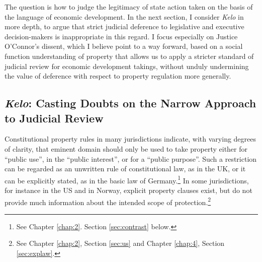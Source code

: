 
The question is how to judge the legitimacy of state action taken on the basis of the language of economic development. In the next section, I consider {\it Kelo} in more depth, to argue that strict judicial deference to legislative and executive decision-makers is inappropriate in this regard. I focus especially on Justice O'Connor's dissent, which I believe point to a way forward, based on a social function understanding of property that allows us to apply a stricter standard of judicial review for economic development takings, without unduly undermining the value of deference with respect to property regulation more generally.




\subsection{{\it Kelo}: Casting Doubts on the Narrow Approach to Judicial Review}

Constitutional property rules in many jurisdictions indicate, with varying degrees of clarity, that eminent domain should only be used to take property either for ``public use'', in the ``public interest'', or for a ``public purpose''. Such a restriction can be regarded as an unwritten rule of constitutional law, as in the UK, or it can be explicitly stated, as in the basic law of Germany.\footnote{See Chapter \ref{chap:2}. Section \ref{sec:contrast} below.} In some jurisdictions, for instance in the US and in Norway, explicit property clauses exist, but do not provide much information about the intended scope of protection.\footnote{See Chapter \ref{chap:2}, Section \ref{sec:us} and Chapter \ref{chap:4}, Section \ref{sec:explaw}.}

